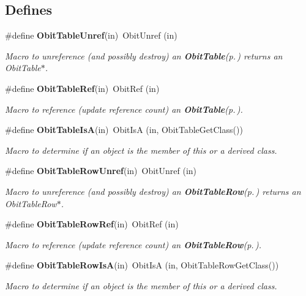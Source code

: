 \subsection*{Defines}
\begin{CompactItemize}
\item 
\#define {\bf Obit\-Table\-Unref}(in)\ Obit\-Unref (in)
\begin{CompactList}\small\item\em Macro to unreference (and possibly destroy) an {\bf Obit\-Table}{\rm (p.\,\pageref{structObitTable})} returns an Obit\-Table$\ast$. \item\end{CompactList}\item 
\#define {\bf Obit\-Table\-Ref}(in)\ Obit\-Ref (in)
\begin{CompactList}\small\item\em Macro to reference (update reference count) an {\bf Obit\-Table}{\rm (p.\,\pageref{structObitTable})}. \item\end{CompactList}\item 
\#define {\bf Obit\-Table\-Is\-A}(in)\ Obit\-Is\-A (in, Obit\-Table\-Get\-Class())
\begin{CompactList}\small\item\em Macro to determine if an object is the member of this or a derived class. \item\end{CompactList}\item 
\#define {\bf Obit\-Table\-Row\-Unref}(in)\ Obit\-Unref (in)
\begin{CompactList}\small\item\em Macro to unreference (and possibly destroy) an {\bf Obit\-Table\-Row}{\rm (p.\,\pageref{structObitTableRow})} returns an Obit\-Table\-Row$\ast$. \item\end{CompactList}\item 
\#define {\bf Obit\-Table\-Row\-Ref}(in)\ Obit\-Ref (in)
\begin{CompactList}\small\item\em Macro to reference (update reference count) an {\bf Obit\-Table\-Row}{\rm (p.\,\pageref{structObitTableRow})}. \item\end{CompactList}\item 
\#define {\bf Obit\-Table\-Row\-Is\-A}(in)\ Obit\-Is\-A (in, Obit\-Table\-Row\-Get\-Class())
\begin{CompactList}\small\item\em Macro to determine if an object is the member of this or a derived class. \item\end{CompactList}\item 

\end{CompactItemize}
